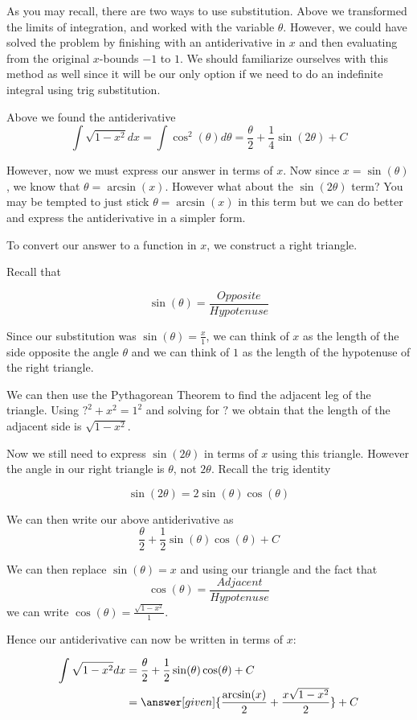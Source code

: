 \documentclass{ximera}
\begin{document}
\begin{example}
\begin{explanation}
As you may recall, there are two ways to use substitution. Above we
transformed the limits of integration, and worked with the variable
$\theta$. However, we could have solved the problem by finishing with
an antiderivative in $x$ and then evaluating from the original $x$-bounds $-1$ to $1$. We should
familiarize ourselves with this method as well since it will be our only option if we need to do 
an indefinite integral using trig substitution. 

 Above we found the antiderivative 
\[
\int \sqrt{1-x^{2}} dx=\int \cos^{2}(\theta) d\theta=\frac{\theta}{2} +\frac{1}{4}\sin(2\theta) + C
\]

    However, now we must express our answer in terms of $x$. Now since $x=\sin(\theta)$, we know
that $\theta=\arcsin(x)$. However what about the $\sin(2\theta)$ term? 
You may be tempted to just stick $\theta=\arcsin(x)$ in this term but we can do better and express the antiderivative
in a simpler form. 
   
    To convert our answer to a function in $x$, we construct a right triangle. 

  Recall that 

\[
\sin(\theta)=\frac{ Opposite}{Hypotenuse}
\]

 Since our substitution was 
$\sin(\theta)=\frac{x}{1}$, we can think of $x$ as the length of the side opposite the angle $\theta$ 
and we can think of $1$ as the length of the hypotenuse of the right triangle. 

    




   
We can then use the Pythagorean Theorem
to find the adjacent leg of the triangle. Using $?^{2}+x^{2}=1^{2}$ and solving for $?$ we obtain 
that the length of the adjacent side is $\sqrt{1-x^{2}}$. 

    





Now we still need to express $\sin(2\theta)$ in terms of $x$ using this triangle. However the angle in our 
right triangle is $\theta$, not $2\theta$. Recall the trig identity

\[
\sin(2\theta)=2\sin(\theta)\cos(\theta)
\]

We can then write our above antiderivative as 
\[
\frac{\theta}{2} +\frac{1}{2}\sin(\theta)\cos(\theta) + C
\]

We can then replace $\sin(\theta)=x$ and using our triangle and the fact that 
\[
\cos(\theta)=\frac{Adjacent}{Hypotenuse}
\]
we can write $\cos(\theta)=\frac{\sqrt{1-x^{2}}}{1}$.

Hence our antiderivative can now be written in terms of $x$:

    \begin{align*}
      \int \sqrt{1-x^2} dx &= \frac{\theta}{2} +\frac{1}{2}\sin(\theta)\cos(\theta)+C \\
      &= \answer[given]{\frac{\arcsin(x)}{2} + \frac{x\sqrt{1-x^2}}{2}} + C 
    \end{align*}
  \end{explanation}
\end{example}
\end{document}
